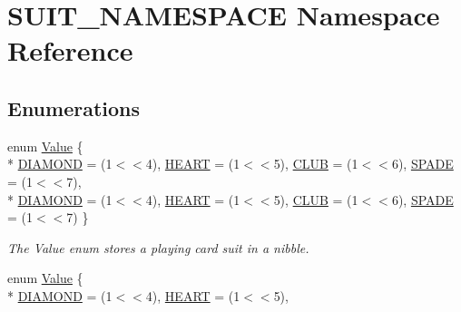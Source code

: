 \hypertarget{namespaceSUIT__NAMESPACE}{\section{S\-U\-I\-T\-\_\-\-N\-A\-M\-E\-S\-P\-A\-C\-E Namespace Reference}
\label{namespaceSUIT__NAMESPACE}
}
\subsection*{Enumerations}
\begin{DoxyCompactItemize}
\item 
enum \hyperlink{namespaceSUIT__NAMESPACE_a363cc949dd5fa79f5e750cc081e4f18a}{Value} \{ \\*
\hyperlink{namespaceSUIT__NAMESPACE_a363cc949dd5fa79f5e750cc081e4f18aa7c904312decd355f2346d6d59b5a4a70}{D\-I\-A\-M\-O\-N\-D} = (1$<$$<$4), 
\hyperlink{namespaceSUIT__NAMESPACE_a363cc949dd5fa79f5e750cc081e4f18aa72845c87ce03a59c40515dfc45b13f1c}{H\-E\-A\-R\-T} = (1$<$$<$5), 
\hyperlink{namespaceSUIT__NAMESPACE_a363cc949dd5fa79f5e750cc081e4f18aa37e3e09d47431b80e5a140f5beab43d3}{C\-L\-U\-B} = (1$<$$<$6), 
\hyperlink{namespaceSUIT__NAMESPACE_a363cc949dd5fa79f5e750cc081e4f18aa1e7c4a99914c76c0bf845cfc9debca3c}{S\-P\-A\-D\-E} = (1$<$$<$7), 
\\*
\hyperlink{namespaceSUIT__NAMESPACE_a363cc949dd5fa79f5e750cc081e4f18aa7c904312decd355f2346d6d59b5a4a70}{D\-I\-A\-M\-O\-N\-D} = (1$<$$<$4), 
\hyperlink{namespaceSUIT__NAMESPACE_a363cc949dd5fa79f5e750cc081e4f18aa72845c87ce03a59c40515dfc45b13f1c}{H\-E\-A\-R\-T} = (1$<$$<$5), 
\hyperlink{namespaceSUIT__NAMESPACE_a363cc949dd5fa79f5e750cc081e4f18aa37e3e09d47431b80e5a140f5beab43d3}{C\-L\-U\-B} = (1$<$$<$6), 
\hyperlink{namespaceSUIT__NAMESPACE_a363cc949dd5fa79f5e750cc081e4f18aa1e7c4a99914c76c0bf845cfc9debca3c}{S\-P\-A\-D\-E} = (1$<$$<$7)
 \}
\begin{DoxyCompactList}\small\item\em The Value enum stores a playing card suit in a nibble. \end{DoxyCompactList}\item 
enum \hyperlink{namespaceSUIT__NAMESPACE_a363cc949dd5fa79f5e750cc081e4f18a}{Value} \{ \\*
\hyperlink{namespaceSUIT__NAMESPACE_a363cc949dd5fa79f5e750cc081e4f18aa7c904312decd355f2346d6d59b5a4a70}{D\-I\-A\-M\-O\-N\-D} = (1$<$$<$4), 
\hyperlink{namespaceSUIT__NAMESPACE_a363cc949dd5fa79f5e750cc081e4f18aa72845c87ce03a59c40515dfc45b13f1c}{H\-E\-A\-R\-T} = (1$<$$<$5), 

\end{DoxyCompactItemize}
